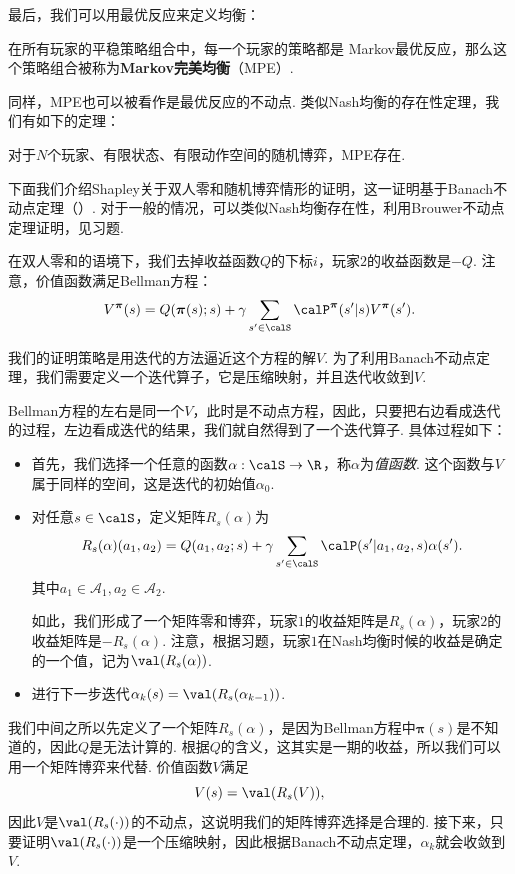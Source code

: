 最后，我们可以用最优反应来定义均衡：

\begin{definition}
    在所有玩家的平稳策略组合中，每一个玩家的策略都是 Markov最优反应，那么这个策略组合被称为\textbf{Markov完美均衡}（MPE）.
\end{definition}

同样，MPE也可以被看作是最优反应的不动点. 类似Nash均衡的存在性定理，我们有如下的定理：

\begin{theorem}
对于$N$个玩家、有限状态、有限动作空间的随机博弈，MPE存在.
\end{theorem}

下面我们介绍Shapley关于双人零和随机博弈情形的证明，这一证明基于Banach不动点定理（）. 对于一般的情况，可以类似Nash均衡存在性，利用Brouwer不动点定理证明，见习题.

在双人零和的语境下，我们去掉收益函数$Q$的下标$i$，玩家$2$的收益函数是$-Q$. 注意，价值函数满足Bellman方程：
    \[V^{\boldsymbol \pi}(s) = Q(\boldsymbol \pi(s);s) + \gamma \sum_{s'\in \calS} \calP^{\boldsymbol\pi}(s'|s)V^{\boldsymbol \pi}(s').\]

我们的证明策略是用迭代的方法逼近这个方程的解$V$. 为了利用Banach不动点定理，我们需要定义一个迭代算子，它是压缩映射，并且迭代收敛到$V$. 

Bellman方程的左右是同一个$V$，此时是不动点方程，因此，只要把右边看成迭代的过程，左边看成迭代的结果，我们就自然得到了一个迭代算子. 具体过程如下：
\begin{itemize}
    \item 首先，我们选择一个任意的函数$\alpha: \calS\to \R$，称$\alpha$为\emph{值函数}. 这个函数与$V$属于同样的空间，这是迭代的初始值$\alpha_0$.
    \item 对任意$s\in \calS$，定义矩阵$R_s(\alpha)$为
    \[R_s(\alpha)(a_1,a_2) = Q(a_1,a_2;s) + \gamma \sum_{s'\in \calS}\calP(s'|a_1,a_2,s)\alpha(s').\]
    其中$a_1\in \mathcal A_1, a_2\in \mathcal A_2$.
    
    如此，我们形成了一个矩阵零和博弈，玩家$1$的收益矩阵是$R_s(\alpha)$，玩家$2$的收益矩阵是$-R_s(\alpha)$. 注意，根据习题，玩家$1$在Nash均衡时候的收益是确定的一个值，记为$\val(R_s(\alpha))$.
    \item 进行下一步迭代$\alpha_k(s)=\val(R_s(\alpha_{k-1}))$. 
\end{itemize}

我们中间之所以先定义了一个矩阵$R_s(\alpha)$，是因为Bellman方程中$\boldsymbol{\pi}(s)$是不知道的，因此$Q$是无法计算的. 根据$Q$的含义，这其实是一期的收益，所以我们可以用一个矩阵博弈来代替. 价值函数$V$满足
\[V(s)=\val(R_s(V)),\]
因此$V$是$\val(R_s(\cdot))$的不动点，这说明我们的矩阵博弈选择是合理的. 接下来，只要证明$\val(R_s(\cdot))$是一个压缩映射，因此根据Banach不动点定理，$\alpha_k$就会收敛到$V$.

